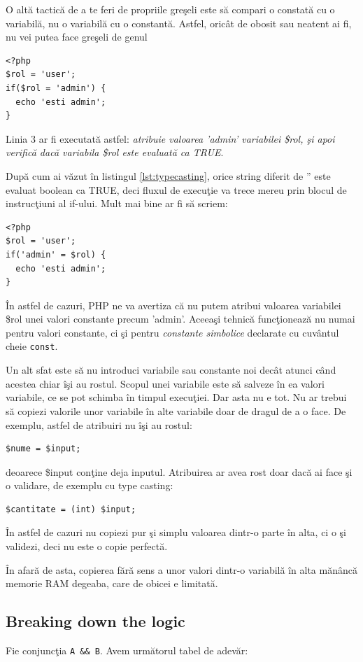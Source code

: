 O altă tactică de a te feri de propriile greşeli este să compari o constată
cu o variabilă, nu o variabilă cu o constantă. Astfel, oricât de obosit
sau neatent ai fi, nu vei putea face greşeli de genul
\begin{lstlisting}
<?php
$rol = 'user';
if($rol = 'admin') {
  echo 'esti admin';
}
\end{lstlisting}
Linia 3 ar fi executată astfel: \textit{atribuie valoarea 'admin' variabilei
\$rol, şi apoi verifică dacă variabila \$rol este evaluată ca TRUE}.

După cum ai văzut în listingul \ref{lst:typecasting}, orice string diferit
de '' este evaluat boolean ca TRUE, deci fluxul de execuţie va trece mereu
prin blocul de instrucţiuni al if-ului. Mult mai bine ar fi să scriem:
\begin{lstlisting}
<?php
$rol = 'user';
if('admin' = $rol) {
  echo 'esti admin';
}
\end{lstlisting}
În astfel de cazuri, PHP ne va avertiza că nu putem atribui valoarea variabilei
\$rol unei valori constante precum 'admin'. Aceeaşi tehnică funcţionează nu numai
pentru valori constante, ci şi pentru \textsl{constante simbolice} declarate cu cuvântul
cheie \texttt{const}.

Un alt sfat este să nu introduci variabile sau constante noi decât atunci când
acestea chiar îşi au rostul. Scopul unei variabile este să salveze în ea
valori variabile, ce se pot schimba în timpul execuţiei. Dar asta nu e tot.
Nu ar trebui să copiezi valorile unor variabile în alte variabile doar
de dragul de a o face. De exemplu, astfel de atribuiri nu îşi au rostul:
\begin{lstlisting}
$nume = $input;
\end{lstlisting}
deoarece \$input conţine deja inputul. Atribuirea ar avea rost doar dacă ai face
şi o validare, de exemplu cu type casting:
\begin{lstlisting}
$cantitate = (int) $input;
\end{lstlisting}
În astfel de cazuri nu copiezi pur şi simplu valoarea dintr-o parte în alta, ci
o şi validezi, deci nu este o {\glqq}copie perfectă{\grqq}.

În afară de asta, copierea fără sens a unor valori dintr-o variabilă în alta mănâncă
memorie RAM degeaba, care de obicei e limitată.

\subsection{Breaking down the logic}
Fie conjuncţia \texttt{A \&\& B}. Avem următorul tabel de adevăr:

